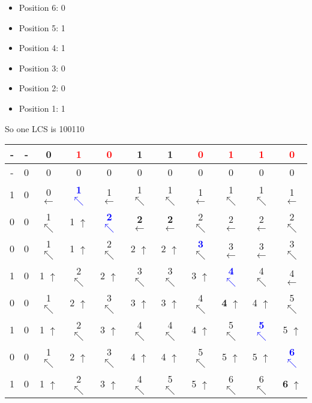 \documentclass[11pt]{article}
\begin{document}
\begin{enumerate}
    \begin{itemize}
        \item Position 6: 0
        \item Position 5: 1
        \item Position 4: 1
        \item Position 3: 0
        \item Position 2: 0
        \item Position 1: 1
    \end{itemize}
    So one LCS is 100110 \\
    \begin{tabular}{ c | c c c c c c c c c c } 
        - & - & 0 & \textcolor{red}{1} & \textcolor{red}{0} & 1 & 1 & \textcolor{red}{0} & \textcolor{red}{1} & \textcolor{red}{1} & \textcolor{red}{0} \\
        \hline
        - & 0 & 0 & 0 & 0 & 0 & 0 & 0 & 0 & 0 & 0 \\
        1 & 0 & 0 $\leftarrow$ & \textcolor{blue}{\textbf{1} $\nwarrow$} & 1 $\leftarrow$ & 1 $\nwarrow$ & 1 $\nwarrow$ & 1 $\leftarrow$ & 1 $\nwarrow$ & 1 $\nwarrow$ & 1 $\leftarrow$ \\
        0 & 0 & 1 $\nwarrow$ & 1 $\uparrow$ & \textcolor{blue}{\textbf{2} $\nwarrow$} & \textbf{2} $\leftarrow$ & \textbf{2} $\leftarrow$ & 2 $\nwarrow$ & 2 $\leftarrow$ & 2 $\leftarrow$ & 2 $\nwarrow$ \\
        0 & 0 & 1 $\nwarrow$ & 1 $\uparrow$ & 2 $\nwarrow$ & 2 $\uparrow$ & 2 $\uparrow$ & \textcolor{blue}{\textbf{3}} $\nwarrow$ & 3 $\leftarrow$ & 3 $\leftarrow$ & 3 $\nwarrow$ \\
        1 & 0 & 1 $\uparrow$ & 2 $\nwarrow$ & 2 $\uparrow$ & 3 $\nwarrow$ & 3 $\nwarrow$ & 3 $\uparrow$ & \textcolor{blue}{\textbf{4} $\nwarrow$} & 4 $\nwarrow$ & 4 $\leftarrow$ \\
        0 & 0 & 1 $\nwarrow$ & 2 $\uparrow$ & 3 $\nwarrow$ & 3 $\uparrow$ & 3 $\uparrow$ & 4 $\nwarrow$ & \textbf{4} $\uparrow$ & 4 $\uparrow$ & 5 $\nwarrow$ \\
        1 & 0 & 1 $\uparrow$ & 2 $\nwarrow$ & 3 $\uparrow$ & 4 $\nwarrow$ & 4 $\nwarrow$ & 4 $\uparrow$ & 5 $\nwarrow$ & \textcolor{blue}{\textbf{5} $\nwarrow$} & 5 $\uparrow$ \\
        0 & 0 & 1 $\nwarrow$ & 2 $\uparrow$ & 3 $\nwarrow$ & 4 $\uparrow$ & 4 $\uparrow$ & 5 $\nwarrow$ & 5 $\uparrow$ & 5 $\uparrow$ & \textcolor{blue}{\textbf{6} $\nwarrow$} \\
        1 & 0 & 1 $\uparrow$ & 2 $\nwarrow$ & 3 $\uparrow$ & 4 $\nwarrow$ & 5 $\nwarrow$ & 5 $\uparrow$ & 6 $\nwarrow$ & 6 $\nwarrow$ & \textbf{6} $\uparrow$ \\
    \end{tabular}
    

\end{enumerate}
\end{document}
